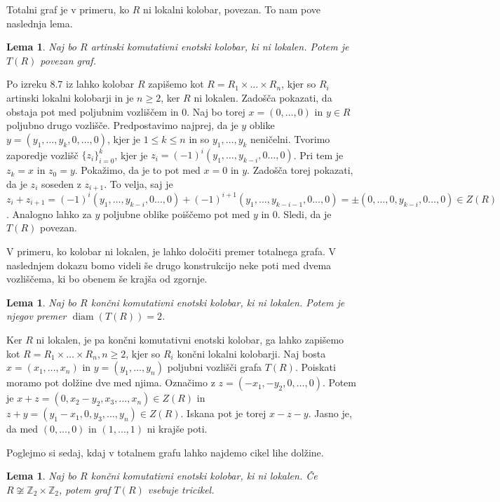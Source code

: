 \documentclass[a4paper, 12pt]{amsart}
\theoremstyle{definition} %
\theoremstyle{plain} %
\newtheorem{lema}[definicija]{Lema}
\newcommand{\Z}{\mathbb Z}
\DeclareMathOperator{\diam}{diam}
\begin{document}
Totalni graf je v primeru, ko $R$ ni lokalni kolobar, povezan. To nam pove naslednja lema.
\begin{lema}
Naj bo $R$ artinski komutativni enotski kolobar, ki ni lokalen. Potem je $T(R)$ povezan graf.
\end{lema}

\proof
Po izreku 8.7 iz \cite{Atiyah} lahko kolobar $R$ zapišemo kot $R=R_1 \times \dots \times R_n$, kjer so $R_i$ artinski lokalni kolobarji in je $n\ge 2$, ker $R$ ni lokalen. Zadošča pokazati, da obstaja pot med poljubnim vozliščem in 0. Naj bo torej $x=(0,\dots,0)$ in $y\in R$ poljubno drugo vozlišče. Predpostavimo najprej, da je $y$ oblike $y=(y_1,\dots,y_k,0,\dots,0)$, kjer je $1\le k \le n$ in so $y_1,\dots,y_k$ neničelni. Tvorimo zaporedje vozlišč $\{z_i\}_{i=0}^k$, kjer je $z_i = (-1)^i (y_1,\dots, y_{k-i},0\dots,0)$. Pri tem je $z_k = x $ in $z_0 = y$. Pokažimo, da je to pot med $x=0 $ in $y$. Zadošča torej pokazati, da je $z_i $ soseden z $z_{i+1}$. To velja, saj je $z_i + z_{i+1} =  (-1)^i (y_1,\dots, y_{k-i},0\dots,0) +  (-1)^{i+1} (y_1,\dots, y_{k-i-1},0\dots,0) = \pm  (0,\dots,0, y_{k-i},0\dots,0)\in Z(R)$. Analogno lahko za $y$ poljubne oblike poiščemo pot med $y$ in $0$. Sledi, da je $T(R)$ povezan.
\endproof

V primeru, ko kolobar ni lokalen, je lahko določiti premer totalnega grafa. V naslednjem dokazu bomo videli še drugo konstrukcijo neke poti med dvema vozliščema, ki bo obenem še krajša od zgornje.

\begin{lema}
Naj bo $R$ končni komutativni enotski kolobar, ki ni lokalen. Potem je njegov premer $\diam(T(R)) = 2$. 
\end{lema}

\proof
Ker $R$ ni lokalen, je pa končni komutativni enotski kolobar, ga lahko zapišemo kot $R= R_1 \times \dots \times R_n, n\ge 2$, kjer so $R_i$ končni lokalni kolobarji. Naj bosta $x=(x_1,\dots, x_n)$ in $y=(y_1,\dots,y_n)$ poljubni vozlišči grafa $T(R)$. Poiskati moramo pot dolžine dve med njima. Označimo z $z=(-x_1,-y_2,0,\dots,0)$. Potem je $x+z = (0,x_2 - y_2,x_3,\dots,x_n)\in Z(R)$ in $z+y = (y_1 - x_1,0,y_3,\dots,y_n)\in Z(R)$. Iskana pot je torej $x-z-y$.  Jasno je, da med $(0,\dots,0)$ in $(1,\dots,1)$ ni krajše poti.
\endproof

Poglejmo si sedaj, kdaj v totalnem grafu lahko najdemo cikel lihe dolžine.

\begin{lema}
Naj bo $R$ končni komutativni enotski kolobar, ki ni lokalen. Če $R\not\cong \Z_2 \times \Z_2$, potem graf $T(R)$ vsebuje tricikel.
\end{lema}
\end{document}
